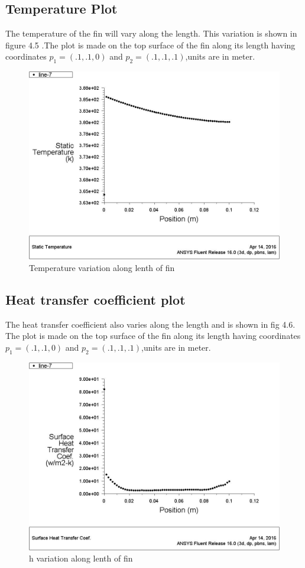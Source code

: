 \subsection{Temperature Plot}

The temperature of the fin will vary along the length. This variation is shown in figure 4.5 .The plot is made on the top surface of the fin along its length having coordinates $p_1 = (.1 , .1 , 0)$ and $ p_2 = (.1 , .1 , .1) $,units are in meter.
 
\begin{figure}[h]
	\label{ss}    %
	\centering
	\includegraphics[width= 10 cm]{108.jpg}
	\caption{ Temperature variation along lenth of fin}
\end{figure}


\subsection{Heat transfer coefficient plot}

The heat transfer coefficient also varies along the length and is shown in fig 4.6. The plot is made on the top surface of the fin along its length having coordinates $p_1 = (.1 , .1 , 0)$ and $p_2 = (.1 , .1 , .1) $,units are in meter.

\begin{figure}[h]
	\label{ss}    %
	\centering
	\includegraphics[width= 10 cm]{109.jpg}
	\caption{ h variation along lenth of fin}
\end{figure}

